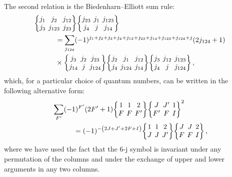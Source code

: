 \documentclass[../Thesis-IJspeert.tex]{subfiles}
\begin{document}
\begin{appendices}
\begin{align}
\end{align}
The second relation is the Biedenharn–Elliott sum rule:
\begin{align}
\begin{split}
&\tj{j_1}{j_2}{j_{12}}{j_3}{j_{123}}{j_{23}}\tj{j_{23}}{j_1}{j_{123}}{j_4}{j}{j_{14}}\\ &\hspace{3em}=\sum_{j_{124}}(-1)^{j_1+j_2+j_3+j_4+j_{12}+j_{23}+j_{14}+j_{123}+j_{124}+j}\left(2 j_{124}+1\right) \\
&\hspace{3em}\times\tj{j_3}{j_2}{j_{23}}{j_{14}}{j}{j_{124}} \tj{j_2}{j_1}{j_{12}}{j_4}{j_{124}}{j_{14}} \tj{j_3}{j_{12}}{j_{123}}{j_4}{j}{j_{124}}\,,
\end{split}
\end{align}
which, for a particular choice of quantum numbers, can be written in the following alternative form:
\begin{align}
\label{elliottrule}
\begin{split}
& \sum_{F'}(-1)^{F'}\left(2 F'+1\right)\tj{1}{1}{2}{F}{F}{F'}\tj{J}{J'}{1}{F'}{F}{I}^2\\
&\hspace{3em}=(-1)^{-\left(2 J+J'+2 F+I\right)}\tj{1}{1}{2}{J}{J}{J'}\tj{J}{J}{2}{F}{F}{I}\,,
\end{split}
\end{align}
where we have used the fact that the 6-j symbol is invariant under any permutation of the columns and under the exchange of upper and lower arguments in any two columns.



\end{appendices}
\end{document}
